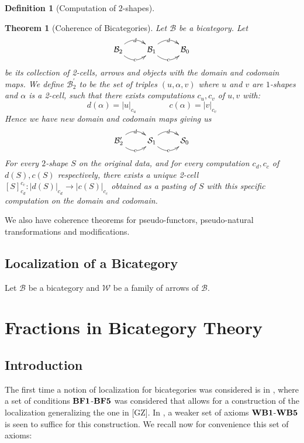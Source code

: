 \documentclass{article}
\numberwithin{equation}{section}
\theoremstyle{definition}
\theoremstyle{plain}
\newtheorem{theorem}[equation]{Theorem}
\newtheorem{definition}[equation]{Definition}
\begin{document}
\begin{definition}[Computation of $2$-shapes]
	
\end{definition}

\begin{theorem}[Coherence of Bicategories] Let $\mathcal{B}$ be a bicategory. Let
	\[\xymatrix{\mathcal{B}_2 \ar@/^1pc/[r]|d \ar@/_1pc/[r]|c & \mathcal{B}_1 \ar@/^1pc/[r]|d \ar@/_1pc/[r]|c & \mathcal{B}_0}\]
	be its collection of 2-cells, arrows and objects with the domain and codomain maps. We define $\mathcal{B}_2^{\prime}$ to be the set of triples $(u,\alpha, v)$ where $u$ and $v$ are $1$-shapes and $\alpha$ is a 2-cell, such that there exists computations $c_u, c_v$ of $u,v$ with:
	\[d(\alpha) = |u|_{c_u} \qquad \qquad c(\alpha) = |v|_{c_v}\]
	Hence we have new domain and codomain maps giving us
	\[\xymatrix{\mathcal{B}_2^{\prime} \ar@/^1pc/[r]|d \ar@/_1pc/[r]|c & \mathcal{S}_1 \ar@/^1pc/[r]|d \ar@/_1pc/[r]|c & \mathcal{S}_0}\]
	For every $2$-shape $S$ on the original data, and for every computation $c_d,c_c$ of $d(S),c(S)$ respectively, there exists a unique 2-cell  $[S]_{c_d}^{c_c}: |d(S)|_{c_d} \to |c(S)|_{c_c}$ obtained as a pasting of $S$ with this specific computation on the domain and codomain.
\end{theorem}

We also have coherence theorems for pseudo-functors, pseudo-natural transformations and modifications.

\subsection{Localization of a Bicategory}

Let $\mathcal{B}$ be a bicategory and $\mathcal{W}$ be a family of arrows of $\mathcal{B}$. 

\newpage
\section{Fractions in Bicategory Theory}

\subsection{Introduction}

The first time a notion of localization for bicategories was considered is in \cite{CM_1996__102_3_243_0}, where a set of conditions $\bf BF1$-$\bf BF5$ was considered that allows for a construction of the localization generalizing the one in [GZ]. In \cite{DoretteLaura}, a weaker set of axioms $\bf WB1$-$\bf WB5$ is seen to suffice for this construction.
We recall now for convenience this set of axioms:
\end{document}
